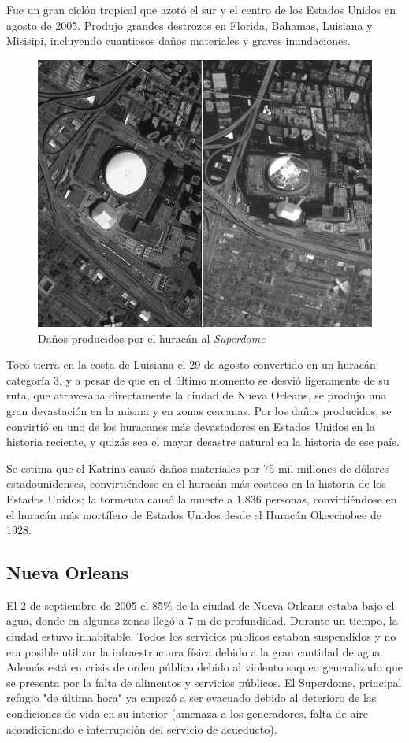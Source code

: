 Fue un gran ciclón tropical que azotó el sur y el centro de los Estados Unidos
en agosto de 2005. Produjo grandes destrozos en Florida, Bahamas, Luisiana y
Misisipi, incluyendo cuantiosos daños materiales y graves inundaciones.

\begin{figure}[H]
 \centering
 \includegraphics[width=120mm]{figuras/cap0/before_after.png}
 \caption{Daños producidos por el huracán al {\em Superdome}}
\end{figure}

Tocó tierra en la costa de Luisiana el 29 de agosto convertido en un huracán
categoría 3, y a pesar de que en el último momento se desvió ligeramente de su
ruta, que atravesaba directamente la ciudad de Nueva Orleans, se produjo una
gran devastación en la misma y en zonas cercanas. Por los daños producidos, se
convirtió en uno de los huracanes más devastadores en Estados Unidos en la
historia reciente, y quizás sea el mayor desastre natural en la historia de ese
país.

Se estima que el Katrina causó daños materiales por 75 mil millones de dólares
estadounidenses, convirtiéndose en el huracán más costoso en la historia de los
Estados Unidos; la tormenta causó la muerte a 1.836 personas, convirtiéndose en
el huracán más mortífero de Estados Unidos desde el Huracán Okeechobee de 1928.

\subsection{Nueva Orleans}

El 2 de septiembre de 2005 el 85\% de la ciudad de Nueva Orleans estaba bajo el
agua, donde en algunas zonas llegó a 7 m de profundidad. Durante un tiempo, la
ciudad estuvo inhabitable. Todos los servicios públicos estaban suspendidos y no
era posible utilizar la infraestructura física debido a la gran cantidad de
agua. Además está en crisis de orden público debido al violento saqueo
generalizado que se presenta por la falta de alimentos y servicios públicos. El
Superdome, principal refugio "de última hora" ya empezó a ser evacuado debido al
deterioro de las condiciones de vida en su interior (amenaza a los generadores,
falta de aire acondicionado e interrupción del servicio de acueducto).

